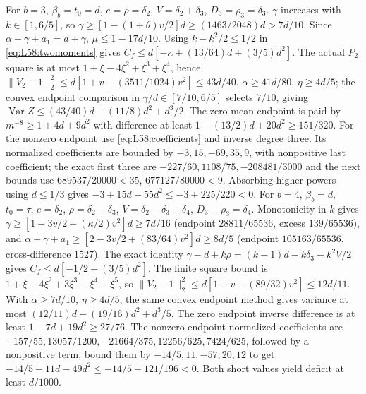 For $b=3$, $\beta_b=t_0=d$, $e=\rho=\delta_2$,
$V=\delta_2+\delta_3$, $D_3=\rho_3=\delta_3$.
$\gamma$ increases with $k\in[1,6/5]$, so
$\gamma\ge[1-(1+\theta)v/2]d\ge(1463/2048)d>7d/10$.
Since $\alpha+\gamma+a_1=d+\gamma$, $\mu\le1-17d/10$.
Using $k-k^2/2\le1/2$ in \eqref{eq:L58:twomoments} gives
$C_f\le d[-\kappa+(13/64)d+(3/5)d^2]$.
The actual $P_2$ square is at most
$1+\xi-4\xi^2+\xi^3+\xi^4$, hence
$\|V_2-1\|_2^2\le d[1+v-(3511/1024)v^2]\le43d/40$.
$\alpha\ge41d/80$, $\eta\ge4d/5$; the convex endpoint comparison
in $\gamma/d\in[7/10,6/5]$ selects $7/10$, giving
$\operatorname{Var}Z\le(43/40)d-(11/8)d^2+d^3/2$.
The zero-mean endpoint is paid by $m^{-8}\ge1+4d+9d^2$ with
difference at least $1-(13/2)d+20d^2\ge151/320$.
For the nonzero endpoint use \eqref{eq:L58:coefficients} and inverse
degree three. Its normalized coefficients are bounded by
$-3,15,-69,35,9$, with nonpositive last coefficient;
the exact first three are $-227/60,1108/75,-208481/3000$ and
the next bounds use $689537/20000<35$, $677127/80000<9$.
Absorbing higher powers using $d\le1/3$ gives
$-3+15d-55d^2\le-3+225/220<0$.
For $b=4$, $\beta_b=d$, $t_0=\tau$, $e=\delta_2$,
$\rho=\delta_2-\delta_3$, $V=\delta_2-\delta_3+\delta_4$,
$D_3-\rho_3=\delta_4$.
Monotonicity in $k$ gives
$\gamma\ge[1-3v/2+(\kappa/2)v^2]d\ge7d/16$
(endpoint $28811/65536$, excess $139/65536$), and
$\alpha+\gamma+a_1\ge[2-3v/2+(83/64)v^2]d\ge8d/5$
(endpoint $105163/65536$, cross-difference $1527$).
The exact identity
$\gamma-d+k\rho=(k-1)d-k\delta_3-k^2V/2$ gives
$C_f\le d[-1/2+(3/5)d^2]$.
The finite square bound is
$1+\xi-4\xi^2+3\xi^3-\xi^4+\xi^5$,
so $\|V_2-1\|_2^2\le d[1+v-(89/32)v^2]\le12d/11$.
With $\alpha\ge7d/10$, $\eta\ge4d/5$, the same convex endpoint
method gives variance at most $(12/11)d-(19/16)d^2+d^3/5$.
The zero endpoint inverse difference is at least
$1-7d+19d^2\ge27/76$.
The nonzero endpoint normalized coefficients are
$-157/55,\allowbreak 13057/1200,\allowbreak -21664/375,\allowbreak 12256/625,\allowbreak 7424/625$, followed
by a nonpositive term; bound them by $-14/5,11,-57,20,12$ to get
$-14/5+11d-49d^2\le-14/5+121/196<0$.
Both short values yield deficit at least $d/1000$.


